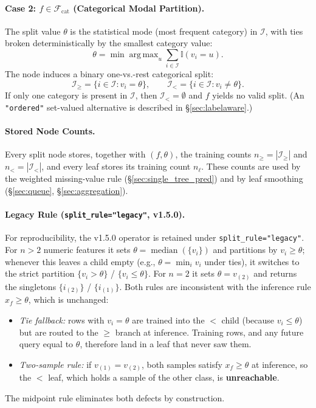 \documentclass[11pt,a4paper]{article}
\newcommand{\code}[1]{\texttt{#1}}
\newcommand{\Ind}{\mathbb{I}}
\DeclareMathOperator*{\argmax}{arg\,max}
\DeclareMathOperator{\median}{median}
\begin{document}
\paragraph{Case 2: $f \in \mathcal{F}_{\text{cat}}$ (Categorical Modal Partition).}
The split value $\theta$ is the statistical mode (most frequent category) in $\mathcal{I}$, with ties broken deterministically by the smallest category value:
\begin{equation}
  \theta = \min \argmax_{u} \sum_{i \in \mathcal{I}} \Ind(v_i = u).
\end{equation}
The node induces a binary one-vs.-rest categorical split:
\begin{equation}
  \mathcal{I}_{\ge} = \{i \in \mathcal{I} : v_i = \theta\},
  \qquad
  \mathcal{I}_{<} = \{i \in \mathcal{I} : v_i \neq \theta\}.
\end{equation}
If only one category is present in $\mathcal{I}$, then $\mathcal{I}_{<} = \emptyset$ and $f$ yields no valid split. (An \code{"ordered"} set-valued alternative is described in \S\ref{sec:labelaware}.)

\paragraph{Stored Node Counts.}
Every split node stores, together with $(f, \theta)$, the training counts $n_{\ge} = |\mathcal{I}_{\ge}|$ and $n_{<} = |\mathcal{I}_{<}|$, and every leaf stores its training count $n_{\ell}$. These counts are used by the weighted missing-value rule (\S\ref{sec:single_tree_pred}) and by leaf smoothing (\S\ref{sec:queue}, \S\ref{sec:aggregation}).

\paragraph{Legacy Rule (\code{split\_rule="legacy"}, v1.5.0).}
For reproducibility, the v1.5.0 operator is retained under \code{split\_rule="legacy"}. For $n > 2$ numeric features it sets $\theta = \median(\{v_i\})$ and partitions by $v_i \ge \theta$; whenever this leaves a child empty (e.g., $\theta = \min_i v_i$ under ties), it switches to the strict partition $\{v_i > \theta\}$ / $\{v_i \le \theta\}$. For $n = 2$ it sets $\theta = v_{(2)}$ and returns the singletons $\{i_{(2)}\}$ / $\{i_{(1)}\}$. Both rules are inconsistent with the inference rule $x_f \ge \theta$, which is unchanged:
\begin{itemize}[leftmargin=*, itemsep=2pt]
  \item \emph{Tie fallback:} rows with $v_i = \theta$ are trained into the $<$ child (because $v_i \le \theta$) but are routed to the $\ge$ branch at inference. Training rows, and any future query equal to $\theta$, therefore land in a leaf that never saw them.
  \item \emph{Two-sample rule:} if $v_{(1)} = v_{(2)}$, both samples satisfy $x_f \ge \theta$ at inference, so the $<$ leaf, which holds a sample of the other class, is \textbf{unreachable}.
\end{itemize}
The midpoint rule eliminates both defects by construction.
\end{document}
